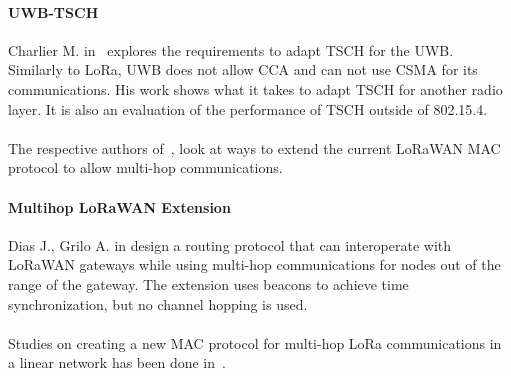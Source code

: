 \paragraph{UWB-TSCH}

Charlier M. in~\cite{uwbtsch} explores the requirements to adapt TSCH for the UWB.
Similarly to LoRa, UWB does not allow CCA and can not use CSMA for its 
communications.
His work shows what it takes to adapt TSCH for another radio layer. 
It is also an evaluation of the performance of TSCH outside of 802.15.4.

\paragraph{}

The respective authors of~\cite{DIAS2018424, 8856256}, look at ways to extend
the current LoRaWAN MAC protocol to allow multi-hop communications.

\paragraph{Multihop LoRaWAN Extension} Dias J., Grilo A. in \cite{DIAS2018424}
design a routing protocol that can interoperate with LoRaWAN gateways while
using multi-hop communications for nodes out of the range of the gateway.  
The extension uses beacons to achieve time synchronization, but no channel
hopping is used.




\paragraph{}

Studies on creating a new MAC protocol for multi-hop LoRa communications in a linear
network has been done in~\cite{Abrardo_2019,duong2018}.

